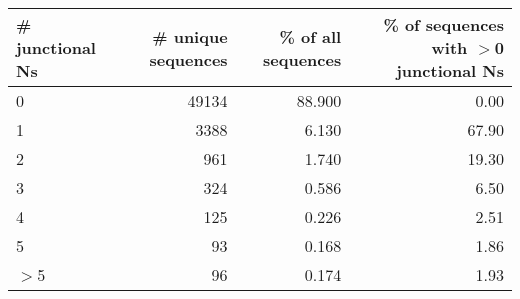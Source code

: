 \begin{tabular}{lrrr}
  \toprule \# junctional Ns & \# unique sequences & \% of all sequences & \% of sequences with $>$0 junctional Ns \\ 
  \midrule 0 & 49134 & 88.900 & 0.00 \\ 
  1 & 3388 & 6.130 & 67.90 \\ 
  2 & 961 & 1.740 & 19.30 \\ 
  3 & 324 & 0.586 & 6.50 \\ 
  4 & 125 & 0.226 & 2.51 \\ 
  5 & 93 & 0.168 & 1.86 \\ 
  $>$5 & 96 & 0.174 & 1.93 \\ 
   \bottomrule \end{tabular}
